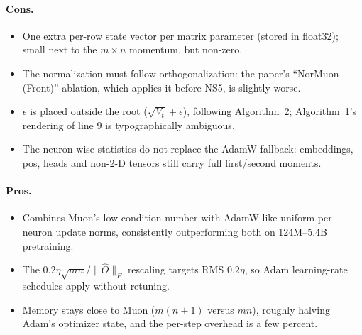 \paragraph{Cons.}
\begin{itemize}[leftmargin=*]
\item One extra per-row state vector per matrix parameter (stored in float32); small
next to the $m \times n$ momentum, but non-zero.
\item The normalization must follow orthogonalization: the paper's ``NorMuon (Front)''
ablation, which applies it before NS5, is slightly worse.
\item $\epsilon$ is placed outside the root ($\sqrt{V_t}+\epsilon$), following
Algorithm~2; Algorithm~1's rendering of line 9 is typographically ambiguous.
\item The neuron-wise statistics do not replace the AdamW fallback: embeddings, pos,
heads and non-2-D tensors still carry full first/second moments.
\end{itemize}

\paragraph{Pros.}
\begin{itemize}[leftmargin=*]
\item Combines Muon's low condition number with AdamW-like uniform per-neuron update
norms, consistently outperforming both on 124M--5.4B pretraining.
\item The $0.2\eta\sqrt{mn}/\lVert\widehat{O}\rVert_F$ rescaling targets RMS $0.2\eta$,
so Adam learning-rate schedules apply without retuning.
\item Memory stays close to Muon ($m(n+1)$ versus $mn$), roughly halving Adam's
optimizer state, and the per-step overhead is a few percent.
\end{itemize}

